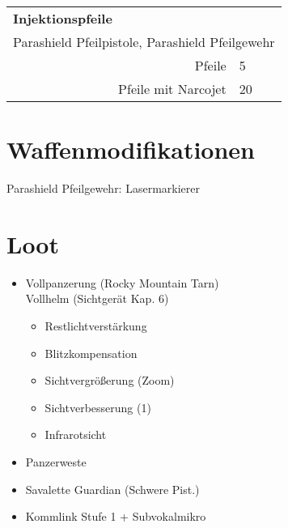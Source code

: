 {\begin{tabular}[]{r | l}
	\multicolumn{2}{l}{\textbf{Injektionspfeile}}\\
	\multicolumn{2}{r}{Parashield Pfeilpistole, Parashield Pfeilgewehr}\\
	\hline
	Pfeile & 5 \\
	Pfeile mit Narcojet & 20 \\
	\hline
\end{tabular}

\section*{Waffenmodifikationen}

Parashield Pfeilgewehr: Lasermarkierer


\section*{Loot}
\begin{itemize}
	\item Vollpanzerung  (Rocky Mountain Tarn)\\
		Vollhelm (Sichtgerät Kap. 6)
		\begin{itemize}
			\item Restlichtverstärkung
			\item Blitzkompensation
			\item Sichtvergrößerung (Zoom)
			\item Sichtverbesserung (1)
			\item Infrarotsicht
		\end{itemize}
	\item Panzerweste
	\item Savalette Guardian (Schwere Pist.)
	\item Kommlink Stufe 1 + Subvokalmikro
\end{itemize}


}

%  
%
